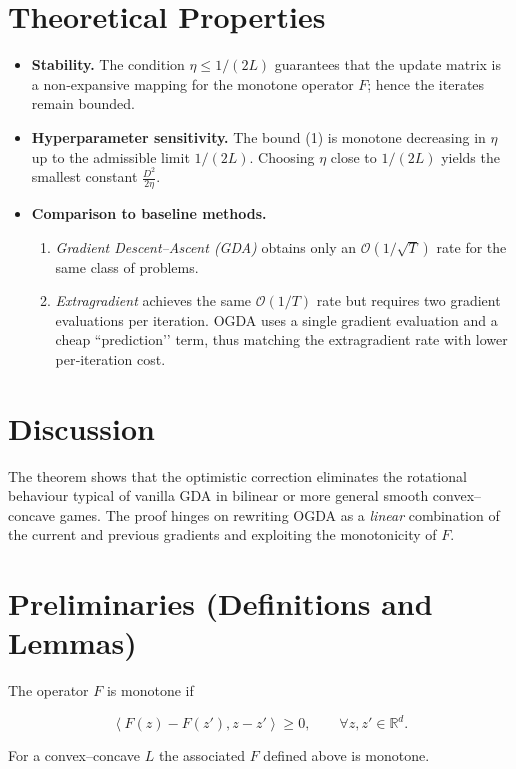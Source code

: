 \documentclass{article}
\newcommand{\iprod}[2]{\left\langle #1,#2\right\rangle}
\begin{document}
\section*{Theoretical Properties}
\begin{itemize}
\item \textbf{Stability.} The condition \(\eta\le 1/(2L)\) guarantees that the
update matrix is a non‑expansive mapping for the monotone operator \(F\);
hence the iterates remain bounded.
\item \textbf{Hyperparameter sensitivity.} The bound (1) is monotone decreasing
in \(\eta\) up to the admissible limit \(1/(2L)\).  Choosing \(\eta\) close to
\(1/(2L)\) yields the smallest constant \(\frac{D^{2}}{2\eta}\).
\item \textbf{Comparison to baseline methods.}
\begin{enumerate}
\item \emph{Gradient Descent–Ascent (GDA)} obtains only an \(\mathcal{O}(1/\sqrt{T})\) rate
for the same class of problems.
\item \emph{Extragradient} achieves the same \(\mathcal{O}(1/T)\) rate but requires two
gradient evaluations per iteration.  OGDA uses a single gradient evaluation
and a cheap “prediction’’ term, thus matching the extragradient rate with
lower per‑iteration cost.
\end{enumerate}
\end{itemize}

\section*{Discussion}
The theorem shows that the optimistic correction eliminates the rotational
behaviour typical of vanilla GDA in bilinear or more general smooth
convex–concave games.  The proof hinges on rewriting OGDA as a
\emph{linear} combination of the current and previous gradients and exploiting
the monotonicity of \(F\).

\newpage
\section*{Preliminaries (Definitions and Lemmas)}
\begin{definition}
The operator \(F\) is monotone if  

\[
\iprod{F(z)-F(z')}{z-z'}\ge 0,\qquad\forall z,z'\in\mathbb{R}^{d}.
\]
\end{definition}
For a convex–concave \(L\) the associated \(F\) defined above is monotone.
\end{document}
